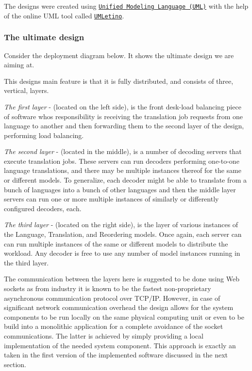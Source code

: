 The designs were created using \href{http://www.uml.org/}{\tt Unified Modeling Language (U\+M\+L)} with the help of the online U\+M\+L tool called \href{http://www.umletino.com/}{\tt U\+M\+Letino}.

\subsubsection*{The ultimate design}

Consider the deployment diagram below. It shows the ultimate design we are aiming at.



This design\textquotesingle{}s main feature is that it is fully distributed, and consists of three, vertical, layers.


\begin{DoxyEnumerate}
\item {\itshape The first layer} -\/ (located on the left side), is the front desk-\/load balancing piece of software who\textquotesingle{}s responsibility is receiving the translation job requests from one language to another and then forwarding them to the second layer of the design, performing load balancing.
\item {\itshape The second layer} -\/ (located in the middle), is a number of decoding servers that execute translation jobs. These servers can run decoders performing one-\/to-\/one language translations, and there may be multiple instances thereof for the same or different models. To generalize, each decoder might be able to translate from a bunch of languages into a bunch of other languages and then the middle layer servers can run one or more multiple instances of similarly or differently configured decoders, each.
\item {\itshape The third layer} -\/ (located on the right side), is the layer of various instances of the Language, Translation, and Reordering models. Once again, each server can can run multiple instances of the same or different models to distribute the workload. Any decoder is free to use any number of model instances running in the third layer.
\end{DoxyEnumerate}

The communication between the layers here is suggested to be done using Web sockets as from industry it is known to be the fastest non-\/proprietary asynchronous communication protocol over T\+C\+P/\+I\+P. However, in case of significant network communication overhead the design allows for the system components to be run locally on the same physical computing unit or even to be build into a monolithic application for a complete avoidance of the socket communications. The latter is achieved by simply providing a local implementation of the needed system component. This approach is exactly an taken in the first version of the implemented software discussed in the next section.

